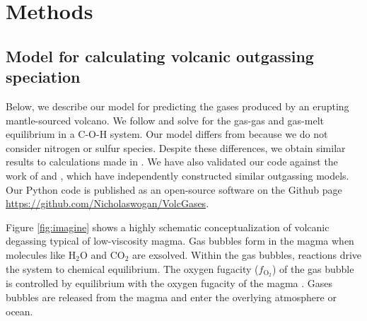 \section{Methods} \label{sec:methods}

\subsection{Model for calculating volcanic outgassing speciation} \label{sec:volcmodel}

Below, we describe our model for predicting the gases produced by an erupting mantle-sourced volcano. We follow \citet{Gaillard_2014} and solve for the gas-gas and gas-melt equilibrium in a C-O-H system. Our model differs from \citet{Gaillard_2014} because we do not consider nitrogen or sulfur species. Despite these differences, we obtain similar results to calculations made in \citet{Gaillard_2014}. We have also validated our code against the work of \citet{Liggins_2020} and \citet{Ortenzi_2020}, which have independently constructed similar outgassing models. Our Python code is published as an open-source software on the Github page \url{https://github.com/Nicholaswogan/VolcGases}. 

Figure \ref{fig:imagine} shows a highly schematic conceptualization of volcanic degassing typical of low-viscosity magma. Gas bubbles form in the magma when molecules like H$_2$O and CO$_2$ are exsolved. Within the gas bubbles, reactions drive the system to chemical equilibrium. The oxygen fugacity ($f_{\mathrm{O_2}}$) of the gas bubble is controlled by equilibrium with the oxygen fugacity of the magma \citep[e.g.][]{Kadoya_2020}. Gases bubbles are released from the magma and enter the overlying atmosphere or ocean.

